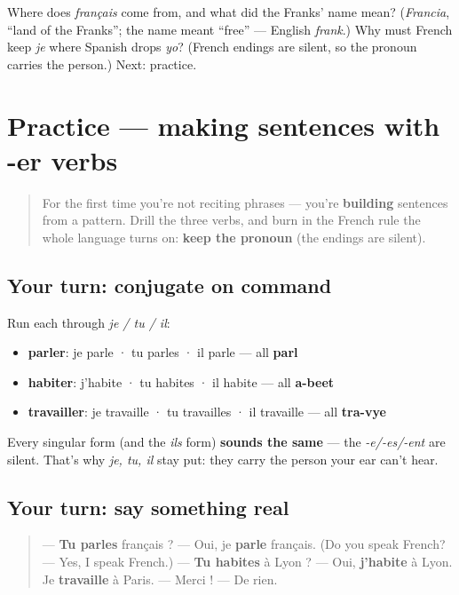 \begin{tcolorbox}[breakable,colback=teal!4,colframe=teal!35!black,title={Before you move on}]
Where does \emph{français} come from, and what did the Franks' name mean? (\emph{Francia}, \textquotedblleft{}land of the Franks\textquotedblright{}; the name meant \textquotedblleft{}free\textquotedblright{} — English \emph{frank}.) Why must French keep \emph{je} where Spanish drops \emph{yo}? (French endings are silent, so the pronoun carries the person.) Next: practice.
\end{tcolorbox}
\section[Practice]{Practice — making sentences with -er verbs}

\label{lesson:FR-C05-practice}



\begin{quote}
For the first time you're not reciting phrases — you're \textbf{building} sentences from a pattern. Drill the three verbs, and burn in the French rule the whole language turns on: \textbf{keep the pronoun} (the endings are silent).
\end{quote}

\subsection*{Your turn: conjugate on command}
Run each through \emph{je / tu / il}:

\begin{itemize}
\raggedright
  \item \textbf{parler}: je parle · tu parles · il parle — all \textbf{parl}
  \item \textbf{habiter}: j'habite · tu habites · il habite — all \textbf{a-beet}
  \item \textbf{travailler}: je travaille · tu travailles · il travaille — all \textbf{tra-vye}
\end{itemize}

Every singular form (and the \emph{ils} form) \textbf{sounds the same} — the \emph{-e/-es/-ent} are silent. That's why \emph{je, tu, il} stay put: they carry the person your ear can't hear.

\subsection*{Your turn: say something real}
\begin{quote}
— \textbf{Tu parles} français ? — Oui, je \textbf{parle} français. (Do you speak French? — Yes, I speak French.) — \textbf{Tu habites} à Lyon ? — Oui, \textbf{j'habite} à Lyon. Je \textbf{travaille} à Paris. — Merci ! — De rien.
\end{quote}

